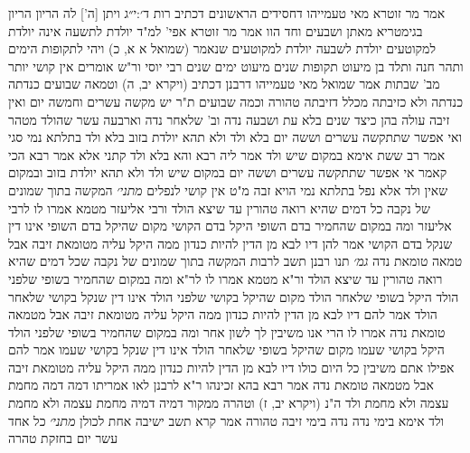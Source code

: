 \documentclass[12pt, openany]{book}
\begin{document}
{אמר מר זוטרא מאי טעמייהו דחסידים הראשונים דכתיב {רות ד׳:י״ג } ויתן [ה'] לה הריון הריון בגימטריא מאתן ושבעים וחד הוו 
אמר מר זוטרא אפי' למ"ד יולדת לתשעה אינה יולדת למקוטעים יולדת לשבעה יולדת למקוטעים שנאמר (שמואל א א, כ) ויהי לתקופות הימים ותהר חנה ותלד בן מיעוט תקופות שנים מיעוט ימים שנים
רבי יוסי ור"ש אומרים אין קושי יותר מב' שבתות אמר שמואל מאי טעמייהו דרבנן דכתיב (ויקרא יב, ה) וטמאה שבועים כנדתה כנדתה ולא כזיבתה מכלל דזיבתה טהורה וכמה שבועים 
ת"ר יש מקשה עשרים וחמשה יום ואין זיבה עולה בהן כיצד שנים בלא עת ושבעה נדה וב' שלאחר נדה וארבעה עשר שהולד מטהר 
ואי אפשר שתתקשה עשרים וששה יום בלא ולד ולא תהא יולדת בזוב 
בלא ולד בתלתא נמי סגי אמר רב ששת אימא במקום שיש ולד אמר ליה רבא והא בלא ולד קתני 
אלא אמר רבא הכי קאמר אי אפשר שתתקשה עשרים וששה יום במקום שיש ולד ולא תהא יולדת בזוב ובמקום שאין ולד אלא נפל בתלתא נמי הויא זבה מ"ט אין קושי לנפלים
{\large\emph{מתני׳}} המקשה בתוך שמונים של נקבה כל דמים שהיא רואה טהורין עד שיצא הולד ורבי אליעזר מטמא
אמרו לו לרבי אליעזר ומה במקום שהחמיר בדם השופי היקל בדם הקושי מקום שהיקל בדם השופי אינו דין שנקל בדם הקושי 
אמר להן דיו לבא מן הדין להיות כנדון ממה היקל עליה מטומאת זיבה אבל טמאה טומאת נדה
{\large\emph{גמ׳}} תנו רבנן תשב לרבות המקשה בתוך שמונים של נקבה שכל דמים שהיא רואה טהורין עד שיצא הולד ור"א מטמא 
אמרו לו לר"א ומה במקום שהחמיר בשופי שלפני הולד היקל בשופי שלאחר הולד מקום שהיקל בקושי שלפני הולד אינו דין שנקל בקושי שלאחר הולד 
אמר להם דיו לבא מן הדין להיות כנדון ממה היקל עליה מטומאת זיבה אבל מטמאה טומאת נדה 
אמרו לו הרי אנו משיבין לך לשון אחר ומה במקום שהחמיר בשופי שלפני הולד היקל בקושי שעמו מקום שהיקל בשופי שלאחר הולד אינו דין שנקל בקושי שעמו 
אמר להם אפילו אתם משיבין כל היום כולו דיו לבא מן הדין להיות כנדון ממה היקל עליה מטומאת זיבה אבל מטמאה טומאת נדה 
אמר רבא בהא זכינהו ר"א לרבנן לאו אמריתו דמה דמה מחמת עצמה ולא מחמת ולד ה"נ (ויקרא יב, ז) וטהרה ממקור דמיה דמיה מחמת עצמה ולא מחמת ולד 
אימא בימי נדה נדה בימי זיבה טהורה אמר קרא תשב ישיבה אחת לכולן
{\large\emph{מתני׳}} כל אחד עשר יום בחזקת טהרה}
\end{document}
